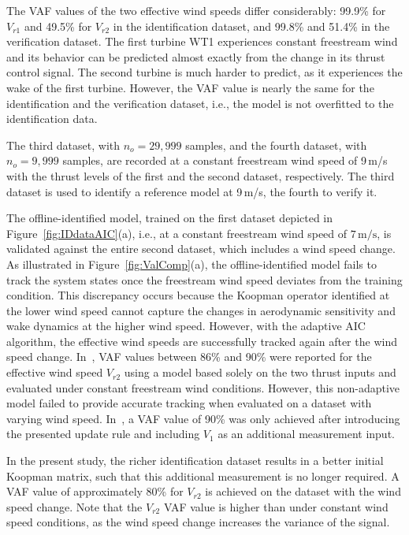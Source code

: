 The VAF values of the two effective wind speeds differ considerably: 99.9\% for $V_{r1}$ and 49.5\% for $V_{r2}$ in the identification dataset, and 99.8\% and 51.4\% in the verification dataset. The first turbine WT1 experiences constant freestream wind and its behavior can be predicted almost exactly from the change in its thrust control signal. The second turbine is much harder to predict, as it experiences the wake of the first turbine. However, the VAF value is nearly the same for the identification and the verification dataset, i.e., the model is not overfitted to the identification data.

The third dataset, with $n_o = 29{,}999$ samples, and the fourth dataset, with $n_o = 9{,}999$ samples, are recorded at a constant freestream wind speed of 9\,m/s with the thrust levels of the first and the second dataset, respectively. The third dataset is used to identify a reference model at 9\,m/s, the fourth to verify it.


The offline-identified model, trained on the first dataset depicted in Figure~\ref{fig:IDdataAIC}(a), i.e., at a constant freestream wind speed of $7\,\mathrm{m/s}$, is validated against the entire second dataset, which includes a wind speed change. As illustrated in Figure~\ref{fig:ValComp}(a), the offline-identified model fails to track the system states once the freestream wind speed deviates from the training condition. This discrepancy occurs because the Koopman operator identified at the lower wind speed cannot capture the changes in aerodynamic sensitivity and wake dynamics at the higher wind speed. However, with the adaptive AIC algorithm, the effective wind speeds are successfully tracked again after the wind speed change. In~\cite{sharan2022Koopman}, VAF values between 86\% and 90\% were reported for the effective wind speed $V_{r2}$ using a model based solely on the two thrust inputs and evaluated under constant freestream wind conditions. However, this non-adaptive model failed to provide accurate tracking when evaluated on a dataset with varying wind speed. In~\cite{dittmer2022data}, a VAF value of 90\% was only achieved after introducing the presented update rule and including $V_1$ as an additional measurement input.

In the present study, the richer identification dataset results in a better initial Koopman matrix, such that this additional measurement is no longer required. A VAF value of approximately 80\% for $V_{r2}$ is achieved on the dataset with the wind speed change. Note that the $V_{r2}$ VAF value is higher than under constant wind speed conditions, as the wind speed change increases the variance of the signal.

